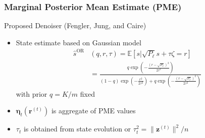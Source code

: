 \documentclass[10pt]{beamer}
\begin{document}
\begin{frame}
\frametitle{Marginal Posterior Mean Estimate (PME)}
\begin{block}{Proposed Denoiser (Fengler, Jung, and Caire)}
\begin{itemize}
\item State estimate based on Gaussian model
\begin{equation*}
\begin{split}
\hat{s}^{\mathrm{OR}} & \left( q, r, \tau \right)
= \mathbb{E} \left[ s | \sqrt{P_{\ell}} s + \tau \zeta = r \right] \\
&= \textstyle \frac{q \exp \left( - \frac{ \left( r - \sqrt{P_{\ell}} \right)^2}{2 \tau^2} \right)}
{(1-q) \exp \left( -\frac{r^2}{2 \tau^2} \right)
+ q \exp \left( - \frac{ \left( r - \sqrt{P_{\ell}} \right)^2}{2 \tau^2} \right)}
\end{split}
\end{equation*}
with prior $q = K/m$ fixed
\item $\boldsymbol{\eta}_t \left( \mathbf{r}^{(t)} \right)$ is aggregate of PME values
\item $\tau_t$ is obtained from state evolution or $\tau_t^2 = {\| \mathbf{z}^{(t)} \|^2}/{n}$
\end{itemize}
\end{block}
\vfill
\begin{center}
\end{center}
\end{frame}
\end{document}
